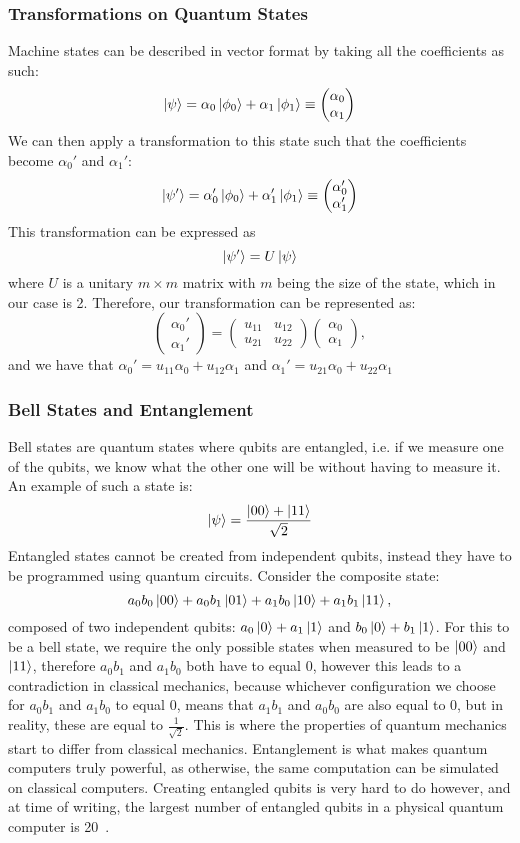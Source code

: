 \subsubsection{Transformations on Quantum States}
Machine states can be described in vector format by taking all the coefficients as such: $$\ket{\psi} = \alpha_0\ket{\phi_0} + \alpha_1\ket{\phi_1} \equiv \begin{pmatrix} \alpha_0 \\ \alpha_1 \end{pmatrix}$$ We can then apply a transformation to this state such that the coefficients become $\alpha_0'$ and $\alpha_1'$: $$\ket{\psi'} = \alpha_0'\ket{\phi_0} + \alpha_1'\ket{\phi_1} \equiv \begin{pmatrix} \alpha_0' \\ \alpha_1' \end{pmatrix}$$ This transformation can be expressed as $$\ket{\psi'} = U\ket{\psi}$$ where $U$ is a unitary $m\times m$ matrix with $m$ being the size of the state, which in our case is 2. Therefore, our transformation can be represented as: $$\begin{pmatrix} \alpha_0' \\ \alpha_1' \end{pmatrix} = \begin{pmatrix} u_{11} & u_{12} \\ u_{21} & u_{22} \end{pmatrix} \begin{pmatrix} \alpha_0 \\ \alpha_1 \end{pmatrix},$$ and we have that $\alpha_0' = u_{11}\alpha_0 + u_{12}\alpha_1$ and $\alpha_1' = u_{21}\alpha_0 + u_{22}\alpha_1$
\subsubsection{Bell States and Entanglement}
Bell states are quantum states where qubits are entangled, i.e. if we measure one of the qubits, we know what the other one will be without having to measure it. An example of such a state is: $$\ket{\psi} = \frac{\ket{00} + \ket{11}}{\sqrt{2}}$$
Entangled states cannot be created from independent qubits, instead they have to be programmed using quantum circuits. Consider the composite state: $$a_0b_0\ket{00} + a_0b_1\ket{01} + a_1b_0\ket{10} + a_1b_1\ket{11},$$ composed of two independent qubits: $a_0\ket{0} + a_1\ket{1}$ and $b_0\ket{0} + b_1\ket{1}$. For this to be a bell state, we require the only possible states when measured to be $\ket{00}$ and $\ket{11}$, therefore $a_0b_1$ and $a_1b_0$ both have to equal 0, however this leads to a contradiction in classical mechanics, because whichever configuration we choose for $a_0b_1$ and $a_1b_0$ to equal 0, means that $a_1b_1$ and $a_0b_0$ are also equal to 0, but in reality, these are equal to $\frac{1}{\sqrt{2}}$. This is where the properties of quantum mechanics start to differ from classical mechanics. Entanglement is what makes quantum computers truly powerful, as otherwise, the same computation can be simulated on classical computers. Creating entangled qubits is very hard to do however, and at time of writing, the largest number of entangled qubits in a physical quantum computer is 20~\cite{mooney2019entanglement}.
